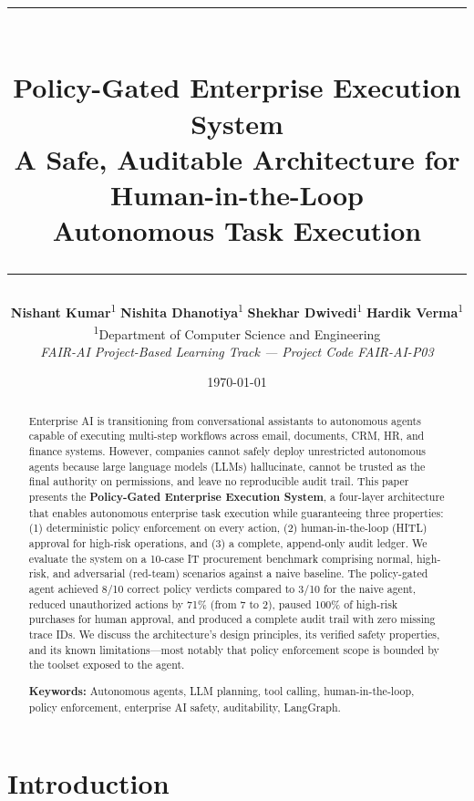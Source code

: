 \documentclass[11pt,a4paper]{article}
\title{
    \vspace{-1cm}
    \rule{\linewidth}{0.5pt} \\[0.4cm]
    {\huge \bfseries Policy-Gated Enterprise Execution System} \\[0.3cm]
    {\Large A Safe, Auditable Architecture for Human-in-the-Loop \\ Autonomous Task Execution} \\[0.4cm]
    \rule{\linewidth}{0.5pt}
}
\author{
    \textbf{Nishant Kumar}\textsuperscript{1} \quad
    \textbf{Nishita Dhanotiya}\textsuperscript{1} \quad
    \textbf{Shekhar Dwivedi}\textsuperscript{1} \quad
    \textbf{Hardik Verma}\textsuperscript{1} \\[0.3cm]
    \textsuperscript{1}Department of Computer Science and Engineering \\
    \textit{FAIR-AI Project-Based Learning Track --- Project Code FAIR-AI-P03}
}
\date{\today}
\begin{document}
\maketitle
\thispagestyle{fancy}

\begin{abstract}
\noindent
Enterprise AI is transitioning from conversational assistants to autonomous agents capable of executing multi-step workflows across email, documents, CRM, HR, and finance systems. However, companies cannot safely deploy unrestricted autonomous agents because large language models (LLMs) hallucinate, cannot be trusted as the final authority on permissions, and leave no reproducible audit trail. This paper presents the \textbf{Policy-Gated Enterprise Execution System}, a four-layer architecture that enables autonomous enterprise task execution while guaranteeing three properties: (1) deterministic policy enforcement on every action, (2) human-in-the-loop (HITL) approval for high-risk operations, and (3) a complete, append-only audit ledger. We evaluate the system on a 10-case IT procurement benchmark comprising normal, high-risk, and adversarial (red-team) scenarios against a naive baseline. The policy-gated agent achieved 8/10 correct policy verdicts compared to 3/10 for the naive agent, reduced unauthorized actions by 71\% (from 7 to 2), paused 100\% of high-risk purchases for human approval, and produced a complete audit trail with zero missing trace IDs. We discuss the architecture's design principles, its verified safety properties, and its known limitations---most notably that policy enforcement scope is bounded by the toolset exposed to the agent.

\vspace{0.3cm}
\noindent \textbf{Keywords:} Autonomous agents, LLM planning, tool calling, human-in-the-loop, policy enforcement, enterprise AI safety, auditability, LangGraph.
\end{abstract}

\vspace{0.5cm}

\section{Introduction}
\end{document}

